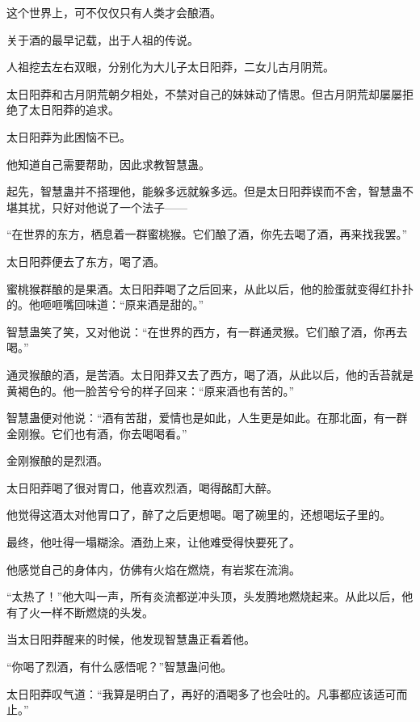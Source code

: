 
\begin{this_body}



这个世界上，可不仅仅只有人类才会酿酒。

关于酒的最早记载，出于人祖的传说。

人祖挖去左右双眼，分别化为大儿子太日阳莽，二女儿古月阴荒。

太日阳莽和古月阴荒朝夕相处，不禁对自己的妹妹动了情思。但古月阴荒却屡屡拒绝了太日阳莽的追求。

太日阳莽为此困恼不已。

他知道自己需要帮助，因此求教智慧蛊。

起先，智慧蛊并不搭理他，能躲多远就躲多远。但是太日阳莽锲而不舍，智慧蛊不堪其扰，只好对他说了一个法子——

“在世界的东方，栖息着一群蜜桃猴。它们酿了酒，你先去喝了酒，再来找我罢。”

太日阳莽便去了东方，喝了酒。

蜜桃猴群酿的是果酒。太日阳莽喝了之后回来，从此以后，他的脸蛋就变得红扑扑的。他咂咂嘴回味道：“原来酒是甜的。”

智慧蛊笑了笑，又对他说：“在世界的西方，有一群通灵猴。它们酿了酒，你再去喝。”

通灵猴酿的酒，是苦酒。太日阳莽又去了西方，喝了酒，从此以后，他的舌苔就是黄褐色的。他一脸苦兮兮的样子回来：“原来酒也有苦的。”

智慧蛊便对他说：“酒有苦甜，爱情也是如此，人生更是如此。在那北面，有一群金刚猴。它们也有酒，你去喝喝看。”

金刚猴酿的是烈酒。

太日阳莽喝了很对胃口，他喜欢烈酒，喝得酩酊大醉。

他觉得这酒太对他胃口了，醉了之后更想喝。喝了碗里的，还想喝坛子里的。

最终，他吐得一塌糊涂。酒劲上来，让他难受得快要死了。

他感觉自己的身体内，仿佛有火焰在燃烧，有岩浆在流淌。

“太热了！”他大叫一声，所有炎流都逆冲头顶，头发腾地燃烧起来。从此以后，他有了火一样不断燃烧的头发。

当太日阳莽醒来的时候，他发现智慧蛊正看着他。

“你喝了烈酒，有什么感悟呢？”智慧蛊问他。

太日阳莽叹气道：“我算是明白了，再好的酒喝多了也会吐的。凡事都应该适可而止。”


\end{this_body}
